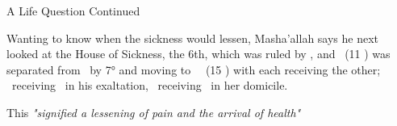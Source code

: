 \begin{frame}[t]{A Life Question Continued}

Wanting to know when the sickness would lessen, Masha'allah says he next looked at the House of Sickness, the 6th, which was ruled by \Saturn, and \Venus\ (11 \Capricorn) was separated from \Saturn\ by 7° and moving to \Trine\ \Mars\ (15 \Taurus) with each receiving the other; \Mars\ receiving \Venus\ in his exaltation, \Venus\ receiving \Mars\ in her domicile.

This \textsl{"signified a lessening of pain and the arrival of health"}

\end{frame}